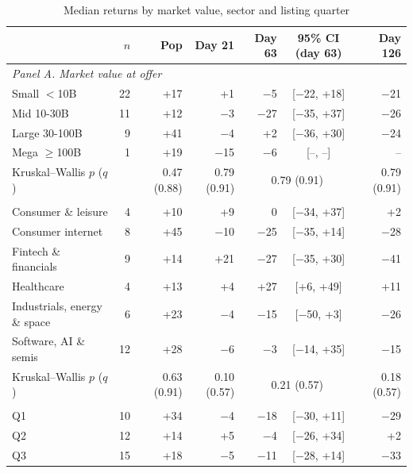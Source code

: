 \begin{table}[!htbp]\centering\footnotesize
\caption{Median returns by market value, sector and listing quarter}\label{tab:buckets}

\begin{threeparttable}
\begin{tabular}{lrrrrcr}
\toprule
& $n$ & Pop & Day 21 & Day 63 & 95\% CI (day 63) & Day 126 \\
\midrule
\multicolumn{7}{l}{\textit{Panel A. Market value at offer}} \\
\quad Small $<$10B & 22 & +17 & +1 & $-$5 & [$-$22, +18] & $-$21 \\
\quad Mid 10-30B & 11 & +12 & $-$3 & $-$27 & [$-$35, +37] & $-$26 \\
\quad Large 30-100B & 9 & +41 & $-$4 & +2 & [$-$36, +30] & $-$24 \\
\quad Mega $\geq$100B & 1 & +19 & $-$15 & $-$6 & [--, --] & -- \\
\quad \footnotesize Kruskal--Wallis $p$ ($q$) & & \footnotesize 0.47 (0.88) & \footnotesize 0.79 (0.91) & \multicolumn{2}{c}{\footnotesize 0.79 (0.91)} & \footnotesize 0.79 (0.91) \\
\addlinespace
\multicolumn{7}{l}{\textit{Panel B. Sector}} \\
\quad Consumer \& leisure & 4 & +10 & +9 & 0 & [$-$34, +37] & +2 \\
\quad Consumer internet & 8 & +45 & $-$10 & $-$25 & [$-$35, +14] & $-$28 \\
\quad Fintech \& financials & 9 & +14 & +21 & $-$27 & [$-$35, +30] & $-$41 \\
\quad Healthcare & 4 & +13 & +4 & +27 & [+6, +49] & +11 \\
\quad Industrials, energy \& space & 6 & +23 & $-$4 & $-$15 & [$-$50, +3] & $-$26 \\
\quad Software, AI \& semis & 12 & +28 & $-$6 & $-$3 & [$-$14, +35] & $-$15 \\
\quad \footnotesize Kruskal--Wallis $p$ ($q$) & & \footnotesize 0.63 (0.91) & \footnotesize 0.10 (0.57) & \multicolumn{2}{c}{\footnotesize 0.21 (0.57)} & \footnotesize 0.18 (0.57) \\
\addlinespace
\multicolumn{7}{l}{\textit{Panel C. Listing quarter}} \\
\quad Q1 & 10 & +34 & $-$4 & $-$18 & [$-$30, +11] & $-$29 \\
\quad Q2 & 12 & +14 & +5 & $-$4 & [$-$26, +34] & +2 \\
\quad Q3 & 15 & +18 & $-$5 & $-$11 & [$-$28, +14] & $-$33 \\

\end{tabular}
\end{threeparttable}
\end{table}
